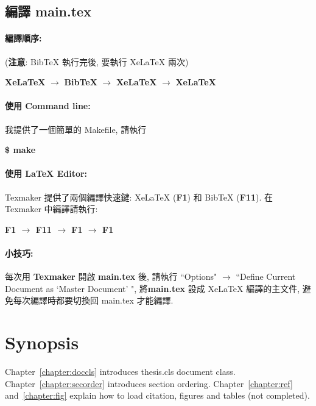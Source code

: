 \subsection{編譯 main.tex}

\paragraph{編譯順序:} (\textbf{注意}: BibTeX 執行完後, 要執行 XeLaTeX 兩次)

\hspace{2em} \textbf{XeLaTeX} $\rightarrow$ \textbf{BibTeX} $\rightarrow$ \textbf{XeLaTeX} $\rightarrow$ \textbf{XeLaTeX}

\paragraph{使用 Command line:} 我提供了一個簡單的 Makefile, 請執行

\hspace{2em} \textbf{\$ make}

\paragraph{使用 LaTeX Editor:}
Texmaker 提供了兩個編譯快速鍵: XeLaTeX (\textbf{F1}) 和 BibTeX (\textbf{F11}).
在 Texmaker 中編譯請執行:

\hspace{2em} \textbf{F1 $\rightarrow$ F11 $\rightarrow$ F1 $\rightarrow$ F1}

\paragraph{小技巧:} 每次用 \textbf{Texmaker} 開啟 \textbf{main.tex} 後, 請執行 ``Options" $\rightarrow$ ``Define Current Document as `Master Document' ", 將\textbf{main.tex} 設成 XeLaTeX 編譯的主文件, 避免每次編譯時都要切換回 main.tex 才能編譯.

\section{Synopsis}

Chapter~\ref{chapter:doccls} introduces thesis.cls document class.
Chapter~\ref{chapter:secorder} introduces section ordering.
Chapter~\ref{chapter:ref} and~\ref{chapter:fig} explain how to load citation, figures and tables (not completed).